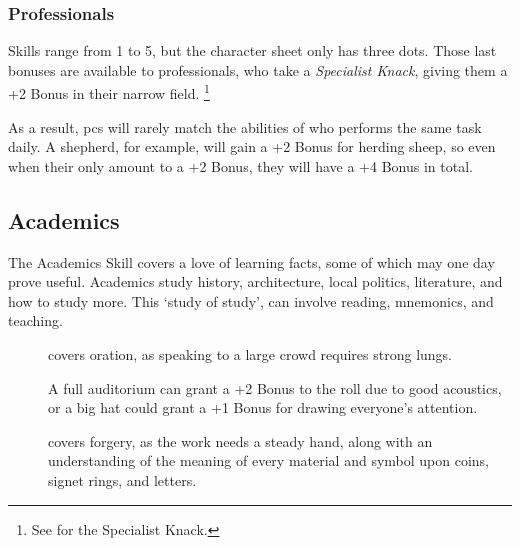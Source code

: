 \begin{multicols}{2}
\subsubsection{Professionals}
Skills range from 1 to 5, but the character sheet only has three dots.
Those last bonuses are available to professionals, who take a \textit{Specialist Knack}, giving them a +2 Bonus in their narrow field.%
\footnote{See  for the Specialist Knack.}

As a result, \glspl{pc} will rarely match the abilities of  who performs the same task daily.
A shepherd, for example, will gain a +2 Bonus for herding sheep, so even when their  only amount to a +2 Bonus, they will have a +4 Bonus in total.

\subsection{Academics}

The Academics Skill covers a love of learning facts, some of which may one day prove useful.
Academics study history, architecture, local politics, literature, and how to study more.
This `study of study', can involve reading, mnemonics, and teaching.


\begin{description}
  \item[]
    covers oration, as speaking to a large crowd requires strong lungs.

    A full auditorium can grant a +2 Bonus to the roll due to good acoustics, or a big hat could grant a +1 Bonus for drawing everyone's attention.
  \item[]
    covers forgery, as the work needs a steady hand, along with an understanding of the meaning of every material and symbol upon coins, signet rings, and letters.


\end{description}
\end{multicols}
